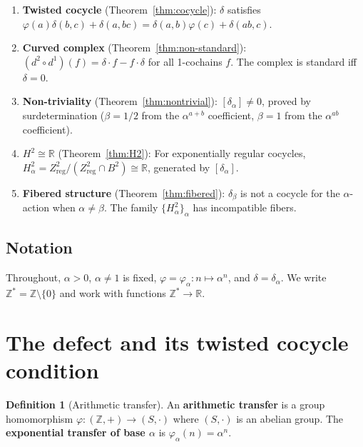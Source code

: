 \documentclass[11pt,a4paper]{article}
\theoremstyle{plain}
\theoremstyle{definition}
\newtheorem{definition}[theorem]{Definition}
\theoremstyle{remark}
\newcommand{\ZZ}{\mathbb{Z}}
\newcommand{\RR}{\mathbb{R}}
\begin{document}
\begin{enumerate}[label=(\roman*)]
\item \textbf{Twisted cocycle} (Theorem~\ref{thm:cocycle}): $\delta$ 
satisfies $\varphi(a)\delta(b,c) + \delta(a,bc) = 
\delta(a,b)\varphi(c) + \delta(ab,c)$.

\item \textbf{Curved complex} (Theorem~\ref{thm:non-standard}): 
$(d^2 \circ d^1)(f) = \delta \cdot f - f \cdot \delta$ for all 
1-cochains $f$. The complex is standard iff $\delta = 0$.

\item \textbf{Non-triviality} (Theorem~\ref{thm:nontrivial}): 
$[\delta_\alpha] \neq 0$, proved by surdetermination ($\beta = 1/2$ 
from the $\alpha^{a+b}$ coefficient, $\beta = 1$ from the 
$\alpha^{ab}$ coefficient).

\item \textbf{$H^2 \cong \RR$} (Theorem~\ref{thm:H2}): For 
exponentially regular cocycles, $H^2_\alpha = 
Z^2_{\mathrm{reg}} / (Z^2_{\mathrm{reg}} \cap B^2) \cong \RR$, 
generated by $[\delta_\alpha]$.

\item \textbf{Fibered structure} (Theorem~\ref{thm:fibered}): 
$\delta_\beta$ is not a cocycle for the $\alpha$-action when $\alpha 
\neq \beta$. The family $\{H^2_\alpha\}_\alpha$ has incompatible 
fibers.
\end{enumerate}

\subsection{Notation}

Throughout, $\alpha > 0$, $\alpha \neq 1$ is fixed, $\varphi = 
\varphi_\alpha : n \mapsto \alpha^n$, and $\delta = \delta_\alpha$. 
We write $\ZZ^* = \ZZ \setminus \{0\}$ and work with functions 
$\ZZ^* \to \RR$.

\section{The defect and its twisted cocycle condition}
\label{sec:cocycle}

\begin{definition}[Arithmetic transfer]
\label{def:transfer}
An \textbf{arithmetic transfer} is a group homomorphism 
$\varphi : (\ZZ, +) \to (S, \cdot)$ where $(S, \cdot)$ is an abelian 
group. The \textbf{exponential transfer of base $\alpha$} is 
$\varphi_\alpha(n) = \alpha^n$.
\end{definition}
\end{document}
